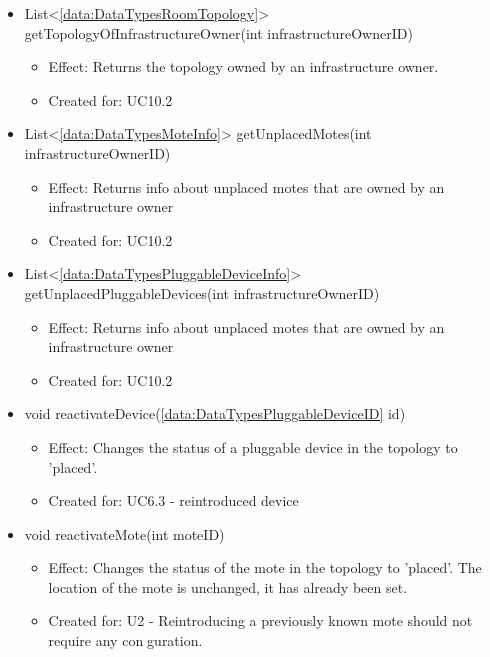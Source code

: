 \begin{description}
\begin{itemize}[noitemsep,nolistsep,leftmargin=-.25cm]
      \item \textsf{List\textless{}\ref{data:DataTypesRoomTopology}\textgreater{} getTopologyOfInfrastructureOwner(int infrastructureOwnerID)}
        \begin{itemize}[noitemsep,nolistsep]
           \item Effect: Returns the topology owned by an infrastructure owner.
\item Created for: UC10.2
        \end{itemize}
      \item \textsf{List\textless{}\ref{data:DataTypesMoteInfo}\textgreater{} getUnplacedMotes(int infrastructureOwnerID)}
        \begin{itemize}[noitemsep,nolistsep]
           \item Effect: Returns info about unplaced motes that are owned by an infrastructure owner
\item Created for: UC10.2
        \end{itemize}
      \item \textsf{List\textless{}\ref{data:DataTypesPluggableDeviceInfo}\textgreater{} getUnplacedPluggableDevices(int infrastructureOwnerID)}
        \begin{itemize}[noitemsep,nolistsep]
           \item Effect: Returns info about unplaced motes that are owned by an infrastructure owner
\item Created for: UC10.2
        \end{itemize}
      \item \textsf{void reactivateDevice(\ref{data:DataTypesPluggableDeviceID} id)}
        \begin{itemize}[noitemsep,nolistsep]
           \item Effect: Changes the status of a pluggable device in the topology to 'placed'.
\item Created for: UC6.3 - reintroduced device
        \end{itemize}
      \item \textsf{void reactivateMote(int moteID)}
        \begin{itemize}[noitemsep,nolistsep]
           \item Effect: Changes the status of the mote in the topology to 'placed'. The location of the mote is unchanged, it has already been set.
\item Created for: U2 - Reintroducing a previously known mote should not require any conguration.
        \end{itemize}

\end{itemize}
\end{description}
